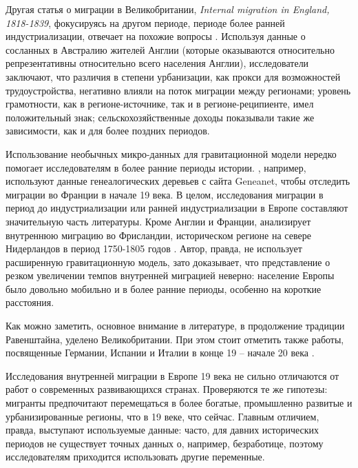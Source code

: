 \documentclass[a4paper,12pt]{article}
\begin{document}
Другая статья о миграции в Великобритании, \emph{Internal migration in England, 1818-1839}, фокусируясь на другом периоде, периоде более ранней индустриализации, отвечает на похожие вопросы \citep{nicholas_internal_1987}. Используя данные о сосланных в Австралию жителей Англии (которые оказываются относительно репрезентативны относительно всего населения Англии), исследователи заключают, что различия в степени урбанизации, как прокси для возможностей трудоустройства, негативно влияли на поток миграции между регионами; уровень грамотности, как в регионе-источнике, так и в регионе-реципиенте, имел положительный знак; сельскохозяйственные доходы показывали такие же зависимости, как и для более поздних периодов.


Использование необычных микро-данных для гравитационной модели нередко помогает исследователям в более ранние периоды истории. \citeauthor{charpentier_internal_2018}, например, используют данные генеалогических деревьев с сайта Geneanet, чтобы отследить миграции во Франции в начале 19 века. В целом, исследования миграции в период до индустриализации или ранней индустриализации в Европе составляют значительную часть литературы. Кроме Англии и Франции, \citeauthor{mccants_internal_1992} анализирует внутреннюю миграцию во Фрисландии, историческом регионе на севере Нидерландов в период 1750-1805 годов \citep{mccants_internal_1992}.  Автор, правда, не использует расширенную гравитационную модель, зато доказывает, что представление о резком увеличении темпов внутренней миграцией неверно: население Европы было довольно мобильно и в более ранние периоды, особенно на короткие расстояния.

Как можно заметить, основное внимание в литературе, в продолжение традиции Равенштайна, уделено Великобритании. При этом стоит отметить также работы, посвященные Германии, Испании и Италии в конце 19 – начале 20 века \citep{silvestre_internal_2005, hochstadt_migration_1981, hogan_migration_1985}.

Исследования внутренней миграции в Европе 19 века не сильно отличаются от работ о современных развивающихся странах. Проверяются те же гипотезы: мигранты предпочитают перемещаться в более богатые, промышленно развитые и урбанизированные регионы, что в 19 веке, что сейчас. Главным отличием, правда, выступают используемые данные: часто, для давних исторических периодов не существует точных данных о, например, безработице, поэтому исследователям приходится использовать другие переменные.
\end{document}
